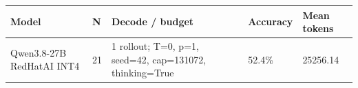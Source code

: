 \begin{tabular}{lllll}
\hline
Model & N & Decode / budget & Accuracy & Mean tokens \\
\hline
Qwen3.8-27B RedHatAI INT4 & 21 & 1 rollout; T=0, p=1, seed=42, cap=131072, thinking=True & 52.4\% & 25256.14 \\
\hline
\end{tabular}
